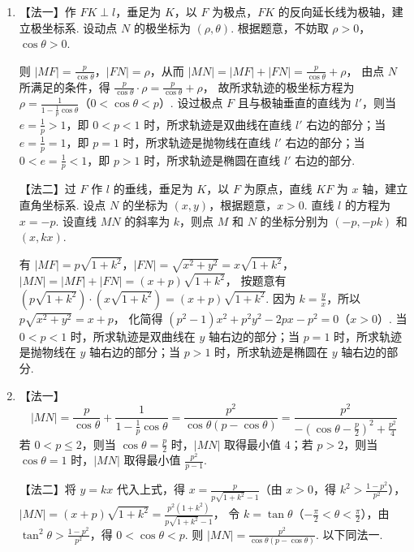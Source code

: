 \begin{solution}
\begin{enumerate}
\item 【法一】作 \(FK\perp l\)，垂足为 \(K\)，以 \(F\) 为极点，\(FK\) 的反向延长线为极轴，建立极坐标系. 设动点 \(N\) 的极坐标为 \((\rho,\theta)\). 根据题意，不妨取 \(\rho>0\)，\(\cos\theta>0\).


则 \(|MF|=\frac{p}{\cos\theta}\)，\(|FN|=\rho\)，从而 \(|MN|=|MF|+|FN|=\frac{p}{\cos\theta}+\rho\)，
由点 \(N\) 所满足的条件，得 \(\frac{p}{\cos\theta}\cdot \rho=\frac{p}{\cos\theta}+\rho\)，
故所求轨迹的极坐标方程为 \(\rho=\frac{1}{1-\frac{1}{p}\cos\theta}\)（\(0<\cos\theta<p\)）.
设过极点 \(F\) 且与极轴垂直的直线为 \(l'\)，则当 \(e=\frac{1}{p}>1\)，即 \(0<p<1\) 时，所求轨迹是双曲线在直线 \(l'\) 右边的部分；当 \(e=\frac{1}{p}=1\)，即 \(p=1\) 时，所求轨迹是抛物线在直线 \(l'\) 右边的部分；当 \(0<e=\frac{1}{p}<1\)，即 \(p>1\) 时，所求轨迹是椭圆在直线 \(l'\) 右边的部分.

【法二】过 \(F\) 作 \(l\) 的垂线，垂足为 \(K\)，以 \(F\) 为原点，直线 \(KF\) 为 \(x\) 轴，建立直角坐标系. 设点 \(N\) 的坐标为 \((x,y)\)，根据题意，\(x>0\). 直线 \(l\) 的方程为 \(x=-p\). 设直线 \(MN\) 的斜率为 \(k\)，则点 \(M\) 和 \(N\) 的坐标分别为 \((-p,-pk)\) 和 \((x,kx)\).


有 \(|MF|=p\sqrt{1+k^2}\)，\(|FN|=\sqrt{x^2+y^2}=x\sqrt{1+k^2}\)，\(|MN|=|MF|+|FN|=(x+p)\sqrt{1+k^2}\)，
按题意有 \((p\sqrt{1+k^2})\cdot (x\sqrt{1+k^2})=(x+p)\sqrt{1+k^2}\). 因为 \(k=\frac{y}{x}\)，所以 \(p\sqrt{x^2+y^2}=x+p\)，
化简得 \((p^2-1)x^2+p^2y^2-2px-p^2=0\)（\(x>0\)）.
当 \(0<p<1\) 时，所求轨迹是双曲线在 \(y\) 轴右边的部分；当 \(p=1\) 时，所求轨迹是抛物线在 \(y\) 轴右边的部分；当 \(p>1\) 时，所求轨迹是椭圆在 \(y\) 轴右边的部分.

\item 【法一】
\[
|MN|=\frac{p}{\cos\theta}+\frac{1}{1-\frac{1}{p}\cos\theta}=\frac{p^2}{\cos\theta (p-\cos\theta)}=\frac{p^2}{-\left( \cos\theta-\frac{p}{2} \right)^2+\frac{p^2}{4}}
\]
若 \(0<p\leqslant 2\)，则当 \(\cos\theta=\frac{p}{2}\) 时，\(|MN|\) 取得最小值 \(4\)；若 \(p>2\)，则当 \(\cos\theta=1\) 时，\(|MN|\) 取得最小值 \(\frac{p^2}{p-1}\).

【法二】将 \(y=kx\) 代入上式，得 \(x=\frac{p}{p\sqrt{1+k^2}-1}\)（由 \(x>0\)，得 \(k^2>\frac{1-p^2}{p^2}\)），
\(|MN|=(x+p)\sqrt{1+k^2}=\frac{p^2(1+k^2)}{p\sqrt{1+k^2}-1}\)，
令 \(k=\tan\theta\)（\(-\frac{\pi}{2}<\theta<\frac{\pi}{2}\)），由 \(\tan^2\theta>\frac{1-p^2}{p^2}\)，得 \(0<\cos\theta<p\). 则 \(|MN|=\frac{p^2}{\cos\theta (p-\cos\theta)}\).
以下同法一.
\end{enumerate}
\end{solution}

